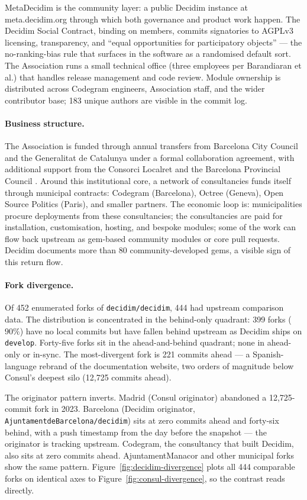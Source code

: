 \documentclass[11pt,a4paper]{article}
\begin{document}
MetaDecidim is the community layer: a public Decidim instance at meta.decidim.org through which both governance and product work happen. The Decidim Social Contract, binding on members, commits signatories to AGPLv3 licensing, transparency, and ``equal opportunities for participatory objects'' \citep{barandiaran2024decidim} --- the no-ranking-bias rule that surfaces in the software as a randomised default sort. The Association runs a small technical office (three employees per Barandiaran et al.) that handles release management and code review. Module ownership is distributed across Codegram engineers, Association staff, and the wider contributor base; 183 unique authors are visible in the commit log.

\paragraph{Business structure.}
The Association is funded through annual transfers from Barcelona City Council and the Generalitat de Catalunya under a formal collaboration agreement, with additional support from the Consorci Localret and the Barcelona Provincial Council \citep{barandiaran2024decidim}. Around this institutional core, a network of consultancies funds itself through municipal contracts: Codegram (Barcelona), Octree (Geneva), Open Source Politics (Paris), and smaller partners. The economic loop is: municipalities procure deployments from these consultancies; the consultancies are paid for installation, customisation, hosting, and bespoke modules; some of the work can flow back upstream as gem-based community modules or core pull requests. Decidim documents more than 80 community-developed gems, a visible sign of this return flow.

\paragraph{Fork divergence.}
Of 452 enumerated forks of \texttt{decidim/decidim}, 444 had upstream comparison data. The distribution is concentrated in the behind-only quadrant: 399 forks ($90\%$) have no local commits but have fallen behind upstream as Decidim ships on \texttt{develop}. Forty-five forks sit in the ahead-and-behind quadrant; none in ahead-only or in-sync. The most-divergent fork is 221 commits ahead --- a Spanish-language rebrand of the documentation website, two orders of magnitude below Consul's deepest silo (12{,}725 commits ahead).

The originator pattern inverts. Madrid (Consul originator) abandoned a 12{,}725-commit fork in 2023. Barcelona (Decidim originator, \texttt{AjuntamentdeBarcelona/decidim}) sits at zero commits ahead and forty-six behind, with a push timestamp from the day before the snapshot --- the originator is tracking upstream. Codegram, the consultancy that built Decidim, also sits at zero commits ahead. AjuntamentManacor and other municipal forks show the same pattern. Figure~\ref{fig:decidim-divergence} plots all 444 comparable forks on identical axes to Figure~\ref{fig:consul-divergence}, so the contrast reads directly.
\end{document}
